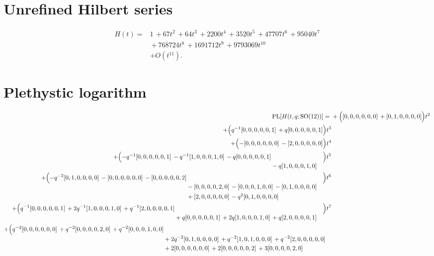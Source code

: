 \documentclass[10pt]{article}
\begin{document}
\section{Unrefined Hilbert series}
\[
\begin{aligned}
H(t) ={}& 1\,+67t^{2}\,+64t^{3}\,+2200t^{4}\,+3520t^{5}\,+47707t^{6}\,+95040t^{7} \\
  &{}+768724t^{8}\,+1691712t^{9}\,+9793069t^{10} \\
  &+ O(t^{11}).
\end{aligned}
\]

\section{Plethystic logarithm}
\[
\begin{aligned}
\operatorname{PL}[H(t,q;\mathrm{SO}(12))] ={}&
  + \Bigl([0,0,0,0,0,0]\,+[0,1,0,0,0,0]\Bigr)t^{2} \\
  + \Bigl(q^{-1}[0,0,0,0,0,1]\,+q[0,0,0,0,0,1]\Bigr)t^{3} \\
  + \Bigl(-[0,0,0,0,0,0]\,-[2,0,0,0,0,0]\Bigr)t^{4} \\
  + \Bigl(\begin{aligned}[t]-q^{-1}[0,0,0,0,0,1]\,-q^{-1}[1,0,0,0,1,0]\,-q[0,0,0,0,0,1] \\
  &{}-q[1,0,0,0,1,0]\end{aligned}\Bigr)t^{5} \\
  + \Bigl(\begin{aligned}[t]-q^{-2}[0,1,0,0,0,0]\,-[0,0,0,0,0,0]\,-[0,0,0,0,0,2] \\
  &{}-[0,0,0,0,2,0]\,-[0,0,0,1,0,0]\,-[0,1,0,0,0,0] \\
  &{}+[2,0,0,0,0,0]\,-q^{2}[0,1,0,0,0,0]\end{aligned}\Bigr)t^{6} \\
  + \Bigl(\begin{aligned}[t]q^{-1}[0,0,0,0,0,1]\,+2q^{-1}[1,0,0,0,1,0]\,+q^{-1}[2,0,0,0,0,1] \\
  &{}+q[0,0,0,0,0,1]\,+2q[1,0,0,0,1,0]\,+q[2,0,0,0,0,1]\end{aligned}\Bigr)t^{7} \\
  + \Bigl(\begin{aligned}[t]q^{-2}[0,0,0,0,0,0]\,+q^{-2}[0,0,0,0,2,0]\,+q^{-2}[0,0,0,1,0,0] \\
  &{}+2q^{-2}[0,1,0,0,0,0]\,+q^{-2}[1,0,1,0,0,0]\,+q^{-2}[2,0,0,0,0,0] \\
  &{}+2[0,0,0,0,0,0]\,+2[0,0,0,0,0,2]\,+3[0,0,0,0,2,0] \\

\end{aligned}
\end{aligned}\]
\end{document}
